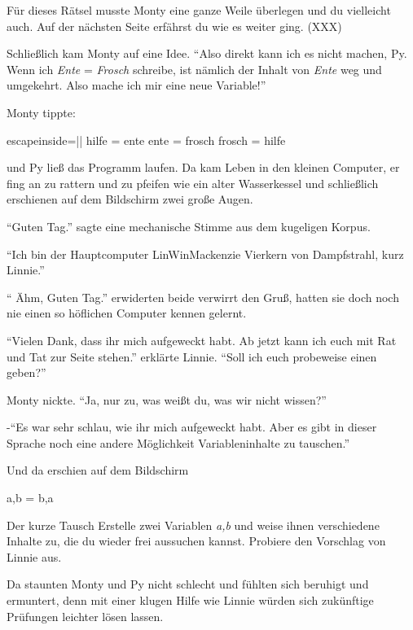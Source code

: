 \documentclass[a5paper,12pt,twoside,openright]{scrbook}
\begin{document}
F\"ur dieses R\"atsel musste Monty eine ganze Weile \"uberlegen und du vielleicht auch.
Auf der n\"achsten Seite erf\"ahrst du wie es weiter ging. (XXX)

Schlie{\ss}lich kam Monty auf eine Idee.
"`Also direkt kann ich es nicht machen, Py. Wenn ich \textit{Ente} = \textit{Frosch} schreibe, ist n\"amlich der Inhalt von \textit{Ente} weg 
und umgekehrt. Also mache ich mir eine neue Variable!"'

Monty tippte:
\begin{pythoncode*}{escapeinside=||}
hilfe  = ente
ente   = frosch 
frosch = hilfe
\end{pythoncode*}

und Py ließ das Programm laufen.
Da kam Leben in den kleinen Computer, er fing an zu rattern und zu pfeifen 
wie ein alter Wasserkessel und schließlich erschienen auf dem Bildschirm zwei gro{\ss}e Augen.

"`Guten Tag."' sagte eine mechanische Stimme aus dem kugeligen Korpus.

"`Ich bin der Hauptcomputer LinWinMackenzie Vierkern von Dampfstrahl, kurz Linnie."'

"` \"Ahm, Guten Tag."' erwiderten beide verwirrt den Gru{\ss}, 
hatten sie doch noch nie einen so h\"oflichen Computer kennen gelernt.

"`Vielen Dank, dass ihr mich aufgeweckt habt. Ab jetzt kann ich euch mit Rat und Tat zur Seite stehen."'
erkl\"arte Linnie.
"`Soll ich euch probeweise einen geben?"'

Monty nickte. "`Ja, nur zu, was wei{\ss}t du, was wir nicht wissen?"'

-"`Es war sehr schlau, wie ihr mich aufgeweckt habt. 
Aber es gibt in dieser Sprache noch eine andere M\"oglichkeit Variableninhalte zu tauschen."'

Und da erschien auf dem Bildschirm
\begin{pythoncode}
 a,b = b,a
\end{pythoncode}



\begin{aufgabe}{Der kurze Tausch}
 Erstelle zwei Variablen \textit{a,b} und weise ihnen verschiedene Inhalte zu, 
die du wieder frei aussuchen kannst.
 Probiere den Vorschlag von Linnie aus.
\end{aufgabe}

Da staunten Monty und Py nicht schlecht und f\"uhlten sich 
beruhigt und ermuntert, denn mit einer klugen Hilfe wie Linnie 
w\"urden sich zuk\"unftige Pr\"ufungen leichter l\"osen lassen.
\end{document}
